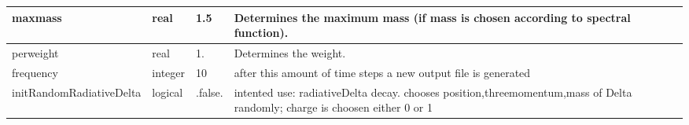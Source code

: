 \documentclass{article}
\begin{document}
\begin{longtable}{llll}
\midrule
maxmass & \begin{minipage}[t]{2cm}real\end{minipage} & \begin{minipage}[t]{2cm}1.5\end{minipage} & \begin{minipage}[t]{12cm}Determines the maximum mass (if mass is chosen according to spectral function).\end{minipage}\\*
\midrule
perweight & \begin{minipage}[t]{2cm}real\end{minipage} & \begin{minipage}[t]{2cm}1.\end{minipage} & \begin{minipage}[t]{12cm}Determines the weight.\end{minipage}\\*
\midrule
frequency & \begin{minipage}[t]{2cm}integer\end{minipage} & \begin{minipage}[t]{2cm}10\end{minipage} & \begin{minipage}[t]{12cm}after this amount of time steps a new output file is generated\end{minipage}\\*
\midrule
initRandomRadiativeDelta & \begin{minipage}[t]{2cm}logical\end{minipage} & \begin{minipage}[t]{2cm}.false.\end{minipage} & \begin{minipage}[t]{12cm}intented use: radiativeDelta decay. chooses position,threemomentum,mass of Delta randomly; charge is choosen either 0 or 1\end{minipage}\\*
\bottomrule
\end{longtable}
{ }



\end{document}
